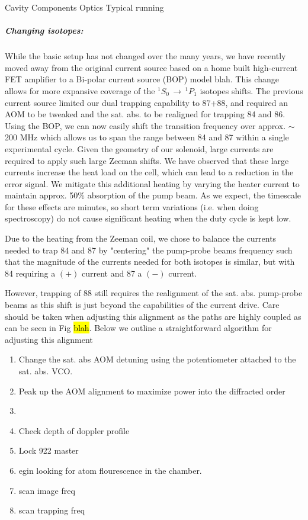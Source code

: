 	Cavity
		Components
			Optics
		Typical running
		
\subparagraph{Changing isotopes:} \label{para:change_iso}
While the basic setup has not changed over the many years, we have recently moved away from the original current source based on a home built high-current FET amplifier to a Bi-polar current source (BOP) model blah. 
This change allows for more expansive coverage of the $^1S_0\,\rightarrow\,^1P_1$ isotopes shifts. The previous current source limited our dual trapping capability to 87+88, and required an AOM to be tweaked and the sat. abs. to be realigned for trapping 84 and 86. 
Using the BOP, we can now easily shift the transition frequency over approx. $\sim$200 MHz which allows us to span the range between 84 and 87 within a single experimental cycle.
Given the geometry of our solenoid, large currents are required to apply such large Zeeman shifts.
We have observed that these large currents increase the heat load on the cell, which can lead to a reduction in the error signal.
We mitigate this additional heating by varying the heater current to maintain approx. 50\% absorption of the pump beam.
As we expect, the timescale for these effects are minutes, so short term variations (i.e. when doing spectroscopy) do not cause significant heating when the duty cycle is kept low.

Due to the heating from the Zeeman coil, we chose to balance the currents needed to trap 84 and 87 by "centering" the pump-probe beams frequency such that the magnitude of the currents needed for both isotopes is similar, but with 84 requiring a $(+)$ current and 87 a $(-)$ current.

However, trapping of 88 still requires the realignment of the sat. abs. pump-probe beams as this shift is just beyond the capabilities of the current drive. 
Care should be taken when adjusting this alignment as the paths are highly coupled as can be seen in Fig \hl{blah}. 
Below we outline a straightforward algorithm for adjusting this alignment
\begin{enumerate}[nolistsep]
\item Change the sat. abs AOM detuning using the potentiometer attached to the sat. abs. VCO. 
\item Peak up the AOM alignment to maximize power into the diffracted order
\item
\item Check depth of doppler profile
\item Lock 922 master
\item egin looking for atom flourescence in the chamber.
\item scan image freq
\item scan trapping freq
\end{enumerate}
		



